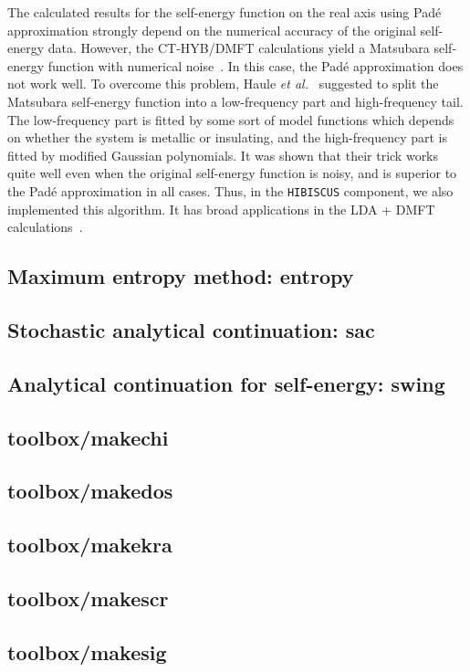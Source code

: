 The calculated results for the self-energy function on the real axis using Pad\'{e} approximation strongly depend on the numerical accuracy of the original self-energy data. However, the CT-HYB/DMFT calculations yield a Matsubara self-energy function with numerical noise~\cite{PhysRevB.76.205120}. In this case, the Pad\'{e} approximation does not work well. To overcome this problem, Haule \emph{et al.}~\cite{PhysRevB.81.195107} suggested to split the Matsubara self-energy function into a low-frequency part and high-frequency tail. The low-frequency part is fitted by some sort of model functions which depends on whether the system is metallic or insulating, and the high-frequency part is fitted by modified Gaussian polynomials. It was shown that their trick works quite well even when the original self-energy function is noisy, and is superior to the Pad\'{e} approximation in all cases. Thus, in the \texttt{HIBISCUS} component, we also implemented this algorithm. It has broad applications in the LDA + DMFT calculations~\cite{RevModPhys.78.865}.

\subsection{Maximum entropy method: entropy}
\subsection{Stochastic analytical continuation: sac}
\subsection{Analytical continuation for self-energy: swing}
\subsection{toolbox/makechi}
\subsection{toolbox/makedos}
\subsection{toolbox/makekra}
\subsection{toolbox/makescr}
\subsection{toolbox/makesig}
